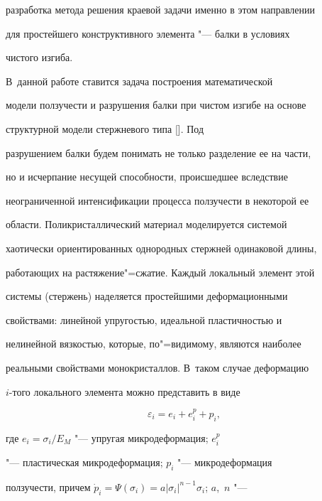 разработка метода решения краевой задачи именно в этом направлении

для простейшего конструктивного элемента "--- балки в условиях

чистого изгиба.



\smallskip



 \linebreak В~данной работе ставится задача построения математической

модели ползучести и разрушения балки при чистом изгибе на основе

структурной модели стержневого типа []. Под

разрушением балки будем понимать не только разделение ее на части,

но и исчерпание несущей способности, происшедшее вследствие

неограниченной интенсификации процесса ползучести в некоторой ее

области. Поликристаллический материал моделируется системой

хаотически ориентированных однородных стержней одинаковой длины,

работающих на растяжение"=сжатие. Каждый локальный элемент этой

системы (стержень) наделяется простейшими деформационными

свойствами: линейной упругостью, идеальной пластичностью и

нелинейной вязкостью, которые, по"=видимому, являются наиболее

реальными свойствами монокристаллов. В~таком случае деформацию

$i$-того локального элемента можно представить в виде

\begin{equation}

\varepsilon_i = e_i +e _i^p +p_i, \label{nebogina:eq:1}

\end{equation}

где $e_i= \sigma_i /E_M$ "--- упругая микродеформация; $e_i^p$

"--- пластическая микродеформация;  $p_i$ "--- микродеформация

ползучести, причем  $\dot{p}_i=

\Psi(\sigma_i)=a|\sigma_i|^{n-1}\sigma_i$;  $a$,~$n$  "---

